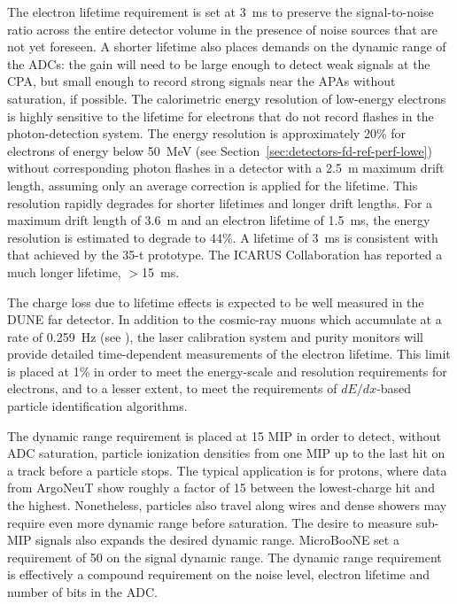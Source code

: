 The electron lifetime requirement is set at 3~ms to preserve the
signal-to-noise ratio across the entire detector volume in the
presence of noise sources that are not yet foreseen.  A shorter
lifetime also places demands on the dynamic range of the ADCs: the
gain will need to be large enough to detect weak signals at the CPA,
but small enough to record strong signals near the APAs without
saturation, if possible.  The calorimetric energy resolution of
low-energy electrons is highly sensitive to the lifetime for electrons
that do not record flashes in the photon-detection system.  The energy
resolution is approximately 20\% for electrons of energy below 50~MeV
(see Section~\ref{sec:detectors-fd-ref-perf-lowe}) without
corresponding photon flashes in a detector with a 2.5~m maximum drift
length, assuming only an average correction is applied for the
lifetime.  This resolution rapidly degrades for shorter lifetimes and
longer drift lengths.  For a maximum drift length of 3.6~m and an
electron lifetime of 1.5~ms, the energy resolution is estimated to
degrade to 44\%.  A lifetime of 3~ms is consistent with that achieved
by the 35-t prototype.  The ICARUS Collaboration has reported a much
longer lifetime, $>$15~ms\cite{Antonello:2014eha}.

The charge loss due to lifetime effects is expected to be well
measured in the DUNE far detector.  In addition to the cosmic-ray
muons which accumulate at a rate of 0.259~Hz (see \anxrates), the
laser calibration system and purity monitors will provide detailed
time-dependent measurements of the electron lifetime.  This
limit is placed at 1\% in order to meet the energy-scale and resolution
requirements for electrons, and to a lesser extent, to meet the requirements
of $dE/dx$-based particle identification algorithms.

The dynamic range requirement is placed at 15 MIP in order to detect,
without ADC saturation, particle ionization densities from one MIP up
to the last hit on a track before a particle stops.  The typical
application is for protons, where data from ArgoNeuT show roughly a
factor of 15 between the lowest-charge hit and the highest.
Nonetheless, particles also travel along wires and dense showers may
require even more dynamic range before saturation.  The desire to
measure sub-MIP signals also expands the desired dynamic range.
MicroBooNE set a requirement of 50 on the signal dynamic
range\cite{microboonetdr}.  The dynamic range requirement is
effectively a compound requirement on the noise level, electron
lifetime and number of bits in the ADC.


